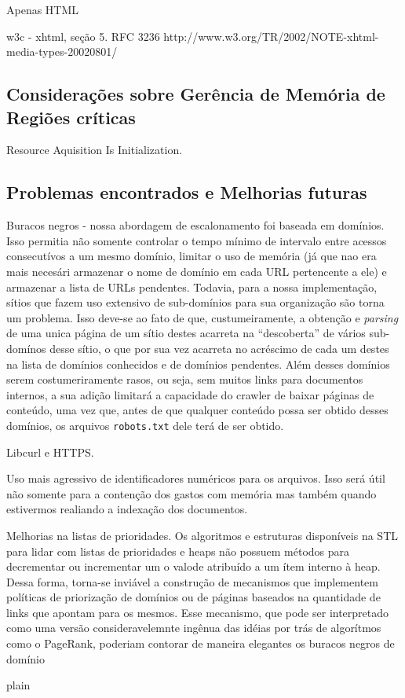 \documentclass[10pt,twocolumn]{article}
\begin{document}
Apenas HTML 

w3c - xhtml, seção 5.
RFC 3236
http://www.w3.org/TR/2002/NOTE-xhtml-media-types-20020801/

\subsection{Considerações sobre Gerência de Memória de Regiões críticas}

Resource Aquisition Is Initialization.

\subsection{Problemas encontrados e Melhorias futuras}

Buracos negros - nossa abordagem de escalonamento foi baseada em domínios. Isso
permitia não somente controlar o tempo mínimo de intervalo entre acessos
consecutívos a um mesmo domínio, limitar o uso de memória (já que nao era mais
necesári armazenar o nome de domínio em cada URL pertencente a ele) e armazenar
a lista de URLs pendentes. Todavia, para a nossa implementação, sítios que
fazem uso extensivo de sub-domínios para sua organização são torna um problema.
Isso deve-se ao fato de que, custumeiramente, a obtenção e \emph{parsing} de
uma unica página de um sítio destes acarreta na ``descoberta'' de vários
sub-domínos desse sítio, o que por sua vez acarreta no acréscimo de cada um
destes na lista de domínios conhecidos e de domínios pendentes. Além desses
domínios serem costumeriramente rasos, ou seja, sem muitos links para
documentos internos, a sua adição limitará a capacidade do crawler de baixar
páginas de conteúdo, uma vez que, antes de que qualquer conteúdo possa ser
obtido desses domínios, os arquivos \texttt{robots.txt} dele terá de ser
obtido.

Libcurl e HTTPS.

Uso mais agressivo de identificadores numéricos para os arquivos. Isso será
útil não somente para a contenção dos gastos com memória mas também quando
estivermos realiando a indexação dos documentos.

Melhorias na listas de prioridades. Os algoritmos e estruturas disponíveis na
STL para lidar com listas de prioridades e heaps não possuem métodos para
decrementar ou incrementar um o valode atribuído a um ítem interno à heap.
Dessa forma, torna-se inviável a construção de mecanismos que implementem
políticas de priorização de domínios ou de páginas baseados na quantidade de
links que apontam para os mesmos. Esse mecanismo, que pode ser interpretado
como uma versão consideravelemnte ingênua das idéias por trás de algorítmos
como o PageRank, poderiam contorar de maneira elegantes os buracos negros de
domínio

\nocite{stroustrup97}
 {plain}

\end{document}
